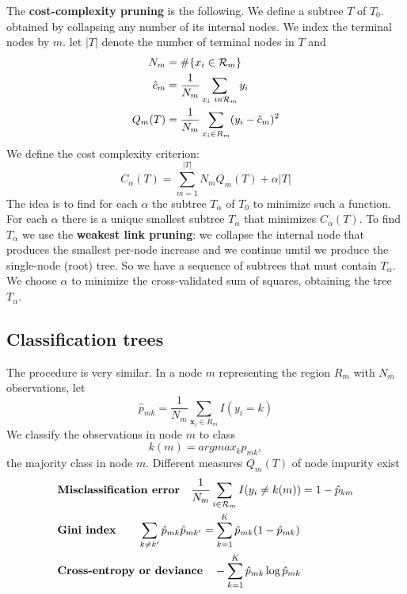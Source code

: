\documentclass[12pt, letterpaper]{article}
\theoremstyle{definition}
\newcommand{\x}{\mathbf{x}}
\begin{document}
The \textbf{cost-complexity pruning} is the following. We define a subtree $T$ of $T_0$. obtained by collapsing any number of its internal nodes. We index the terminal nodes by $m$. let $|T|$ denote the number of terminal nodes in $T$ and 
\begin{equation}
\begin{aligned}
N_m &= \#\{x_i \in \CMcal{R}_m\}\\
\hat{c}_m &= \frac{1}{N_m} \sum_{x_i \ in \CMcal{R}_m} y_i\\
Q_m(T) &= \frac{1}{N_m} \sum_{x_i \in R_m}(y_i - \hat{c}_m)^2
\end{aligned}
\end{equation} 
We define the cost complexity criterion:
\begin{equation}
C_\alpha (T) = \sum_{m=1}^{|T|} N_m Q_m(T) + \alpha |T|
\end{equation}
The idea is to find for each $\alpha$ the subtree $T_\alpha$ of $T_0$ to minimize such a function.
For each $\alpha$ there is a unique smallest subtree $T_\alpha$ that minimizes $C_\alpha(T)$. To find $T_\alpha$ we use the \textbf{weakest link pruning}: we collapse the internal node that produces the smallest per-node increase and we continue umtil we produce the single-node (root) tree. So we have a sequence of subtrees that must contain $T_\alpha$. We choose $\alpha$ to minimize the cross-validated sum of squares, obtaining the tree $T_\alpha$.

\subsection{Classification trees}
The procedure is very similar. In a node $m$ representing the region $R_m$ with $N_m$ observations, let 
\begin{equation}
\hat{p}_{mk} = \frac{1}{N_m}\sum_{\x_i\in R_m} I(y_i=k)
\end{equation}
We classify the observations in node $m$ to class
\begin{equation}
k(m) =argmax_k \hat{p}_{mk},
\end{equation}
the majority class in node $m$. Different measures $Q_m(T)$ of node impurity exist
\begin{equation}
\begin{aligned}
&\textbf{Misclassification error} \quad \frac{1}{N_m} \sum_{i\in \CMcal{R}_m} I(y_i \ne k(m))=1-\hat{p}_{km}\\
&\textbf{Gini index} \quad\quad \sum_{k\ne k'} \hat{p}_{mk}\hat{p}_{mk'} = \sum_{k=1}^K \hat{p}_{mk}(1- \hat{p}_{mk})\\
&\textbf{Cross-entropy or deviance} \quad -\sum_{k=1}^K \hat{p}_{mk}\log \hat{p}_{mk}
\end{aligned}
\end{equation}
\end{document}
